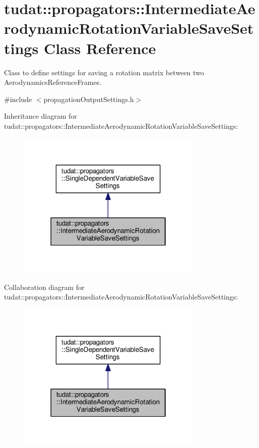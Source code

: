 \hypertarget{classtudat_1_1propagators_1_1IntermediateAerodynamicRotationVariableSaveSettings}{}\section{tudat\+:\+:propagators\+:\+:Intermediate\+Aerodynamic\+Rotation\+Variable\+Save\+Settings Class Reference}
\label{classtudat_1_1propagators_1_1IntermediateAerodynamicRotationVariableSaveSettings}


Class to define settings for saving a rotation matrix between two Aerodynamics\+Reference\+Frames.  




{\ttfamily \#include $<$propagation\+Output\+Settings.\+h$>$}



Inheritance diagram for tudat\+:\+:propagators\+:\+:Intermediate\+Aerodynamic\+Rotation\+Variable\+Save\+Settings\+:
\nopagebreak
\begin{figure}[H]
\begin{center}
\leavevmode
\includegraphics[width=250pt]{classtudat_1_1propagators_1_1IntermediateAerodynamicRotationVariableSaveSettings__inherit__graph}
\end{center}
\end{figure}


Collaboration diagram for tudat\+:\+:propagators\+:\+:Intermediate\+Aerodynamic\+Rotation\+Variable\+Save\+Settings\+:
\nopagebreak
\begin{figure}[H]
\begin{center}
\leavevmode
\includegraphics[width=250pt]{classtudat_1_1propagators_1_1IntermediateAerodynamicRotationVariableSaveSettings__coll__graph}
\end{center}
\end{figure}
